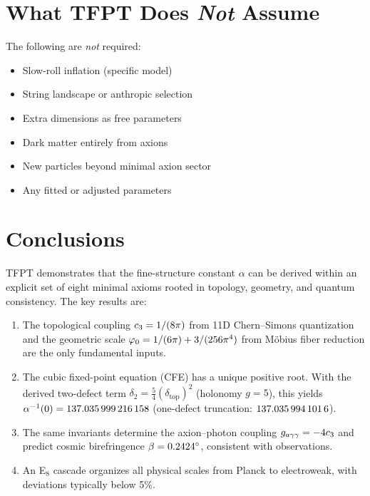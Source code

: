 \section{What TFPT Does \emph{Not} Assume}

The following are \emph{not} required:
\begin{itemize}[leftmargin=2em]
    \item[\ding{55}] Slow-roll inflation (specific model)
    \item[\ding{55}] String landscape or anthropic selection
    \item[\ding{55}] Extra dimensions as free parameters
    \item[\ding{55}] Dark matter entirely from axions
    \item[\ding{55}] New particles beyond minimal axion sector
    \item[\ding{55}] Any fitted or adjusted parameters
\end{itemize}

\section{Conclusions}

TFPT demonstrates that the fine-structure constant $\alpha$ can be derived 
within an explicit set of eight minimal axioms rooted in topology, geometry, 
and quantum consistency. The key results are:

\begin{enumerate}
    \item The topological coupling $c_3 = 1/(8\pi)$ from 11D Chern--Simons 
        quantization and the geometric scale $\varphi_0 = 1/(6\pi) + 3/(256\pi^4)$ 
        from M\"obius fiber reduction are the only fundamental inputs.
    
    \item The cubic fixed-point equation (CFE) has a unique positive root. With the derived two-defect term $\delta_2=\frac54(\delta_{\mathrm{top}})^2$ (holonomy $g=5$), this yields
        $\alpha^{-1}(0)=\num[round-mode=places,round-precision=12]{\TFPTalphaInvGOverFourNum}$ (one-defect truncation: $\num[round-mode=places,round-precision=10]{\TFPTalphaInvSelfNum}$).
    
    \item The same invariants determine the axion--photon coupling 
        $g_{a\gamma\gamma} = -4c_3$ and predict cosmic birefringence 
        $\beta = \num[round-mode=places,round-precision=4]{\TFPTbetaDegNum}^\circ$, consistent with observations.
    
    \item An E$_8$ cascade organizes all physical scales from Planck to 
        electroweak, with deviations typically below 5\%.
\end{enumerate}

